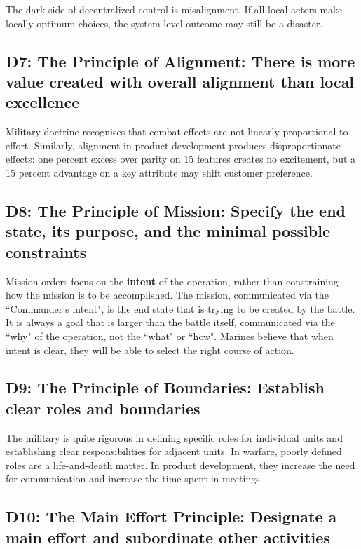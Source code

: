 \documentclass{article}
\begin{document}
\begin{multicols}{2}

\noindent
The dark side of decentralized control is misalignment. If all local actors make locally optimum choices, the system level outcome may still be a disaster.

\subsection{D7: The Principle of Alignment: There is more value created with overall alignment than local excellence}

Military doctrine recognises that combat effects are not linearly proportional to effort. Similarly, alignment in product development produces disproportionate effects: one percent excess over parity on 15 features creates no excitement, but a 15 percent advantage on a key attribute may shift customer preference.

\subsection{D8: The Principle of Mission: Specify the end state, its purpose, and the minimal possible constraints}

Mission orders focus on the \textbf{intent} of the operation, rather than constraining how the mission is to be accomplished. The mission, communicated via the ``Commander's intent", is the end state that is trying to be created by the battle. It is always a goal that is larger than the battle itself, communicated via the ``why" of the operation, not the ``what" or ``how". Marines believe that when intent is clear, they will be able to select the right course of action.

\subsection{D9: The Principle of Boundaries: Establish clear roles and boundaries}

The military is quite rigorous in defining specific roles for individual units and establishing clear responsibilities for adjacent units. In warfare, poorly defined roles are a life-and-death matter. In product development, they increase the need for communication and increase the time spent in meetings.

\subsection{D10: The Main Effort Principle: Designate a main effort and subordinate other activities}


\end{multicols}
\end{document}
